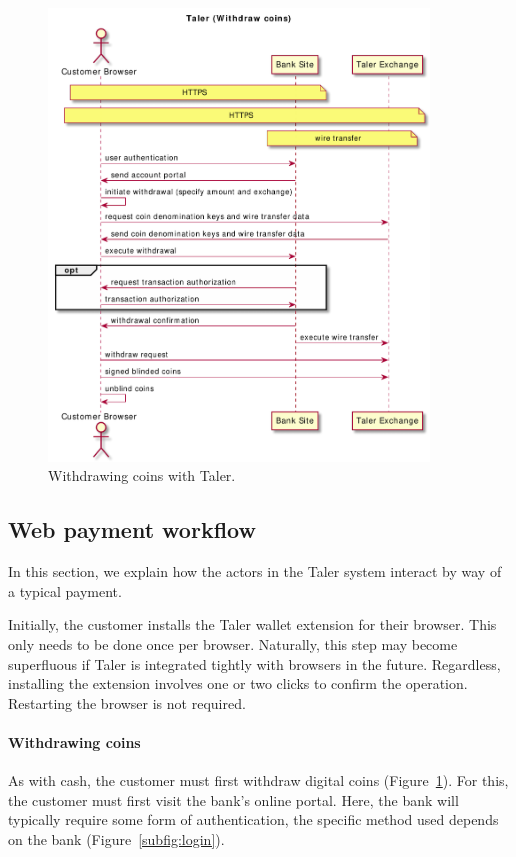\documentclass{IEEEtran}
\begin{document}
\begin{figure}
\includegraphics[width=0.9\textwidth]{figs/taler-withdraw.pdf}
\caption{Withdrawing coins with Taler.}
\label{fig:taler-withdraw}
\end{figure}


\subsection{Web payment workflow}

In this section, we explain how the actors in the Taler system
interact by way of a typical payment.

Initially, the customer installs the Taler wallet extension
for their browser.  This only needs to be done once
per browser. Naturally, this step may become superfluous if
Taler is integrated tightly with browsers in the future.  Regardless,
installing the extension involves one or two clicks to confirm the
operation. Restarting the browser is not required.

\paragraph{Withdrawing coins}

As with cash, the customer must first withdraw digital coins
(Figure~\ref{fig:taler-withdraw}).  For this, the customer must first
visit the bank's online portal.  Here, the bank will
typically require some form of authentication, the specific method
used depends on the bank (Figure~\ref{subfig:login}).
\end{document}
